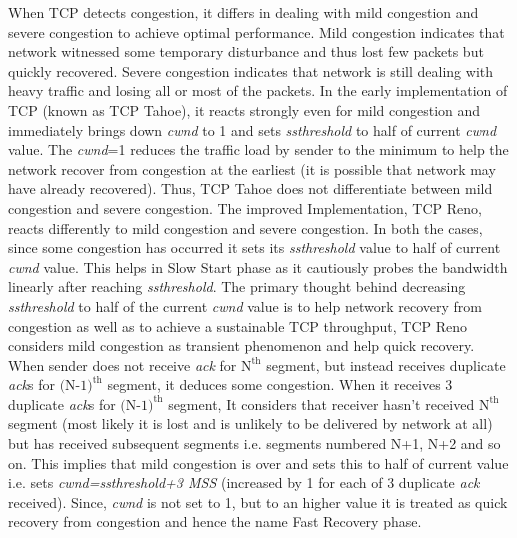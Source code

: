 \begin{multicols}{2}
When TCP detects congestion, it differs in dealing with mild congestion and severe congestion to achieve optimal performance.  Mild congestion indicates that network witnessed some temporary disturbance and thus lost few packets but quickly recovered. Severe congestion indicates that network is still dealing with heavy traffic and losing all or most of the packets. In the early implementation of TCP (known as TCP Tahoe), it reacts strongly even for mild congestion and immediately brings down \textit{cwnd} to 1 and sets \textit{ssthreshold} to half of current \textit{cwnd} value. The \textit{cwnd}=1 reduces the traffic load by sender to the minimum to help the network recover from congestion at the earliest (it is possible that network may have already recovered). Thus, TCP Tahoe does not differentiate between mild congestion and severe congestion. The improved Implementation, TCP Reno, reacts differently to mild congestion and severe congestion. In both the cases, since some congestion has occurred it sets its \textit{ssthreshold} value to half of current \textit{cwnd} value. This helps in Slow Start phase as it cautiously probes the bandwidth linearly after reaching \textit{ssthreshold}. The primary thought behind decreasing \textit{ssthreshold} to half of the current \textit{cwnd} value is to help network recovery from congestion as well as to achieve a sustainable TCP throughput, TCP Reno considers mild congestion as transient phenomenon and help quick recovery. When sender does not receive \textit{ack} for $\text{N}^{\text{th}}$ segment, but  instead receives duplicate \textit{ack}s for $\text{(N-1)}^{\text{th}}$ segment, it deduces some congestion. When it receives 3 duplicate \textit{ack}s for $\text{(N-1)}^{\text{th}}$  segment, It considers that receiver hasn’t received $\text{N}^{\text{th}}$ segment (most likely it is lost and is unlikely to be delivered by network at all) but has received subsequent segments i.e. segments numbered N+1, N+2 and so on. This implies that mild congestion is over and sets this to half of current value i.e. sets \textit{cwnd=ssthreshold+3 MSS} (increased by 1 for each of 3 duplicate \textit{ack} received). Since, \textit{cwnd} is not set to 1, but to an higher value it is treated as quick recovery from congestion and hence the name Fast Recovery phase.


\end{multicols}
